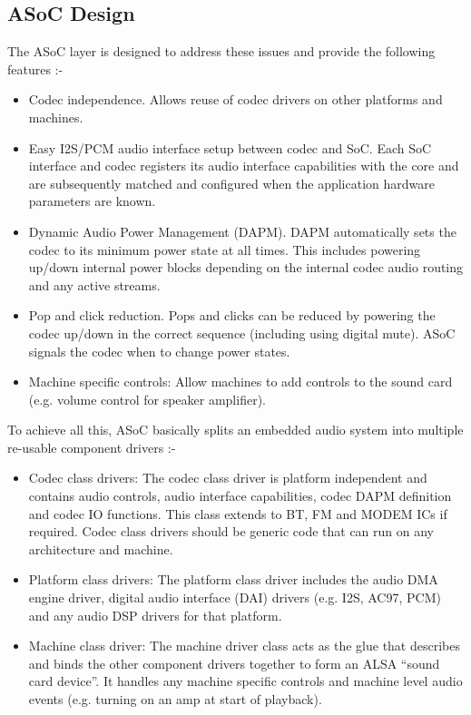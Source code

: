 \documentclass[a4paper,8pt,english]{sphinxmanual}
\begin{document}
\subsection{ASoC Design}
\label{sound/soc/overview:asoc-design}
The ASoC layer is designed to address these issues and provide the following
features :-
\begin{itemize}
\item {} 
Codec independence. Allows reuse of codec drivers on other platforms
and machines.

\item {} 
Easy I2S/PCM audio interface setup between codec and SoC. Each SoC
interface and codec registers its audio interface capabilities with the
core and are subsequently matched and configured when the application
hardware parameters are known.

\item {} 
Dynamic Audio Power Management (DAPM). DAPM automatically sets the codec to
its minimum power state at all times. This includes powering up/down
internal power blocks depending on the internal codec audio routing and any
active streams.

\item {} 
Pop and click reduction. Pops and clicks can be reduced by powering the
codec up/down in the correct sequence (including using digital mute). ASoC
signals the codec when to change power states.

\item {} 
Machine specific controls: Allow machines to add controls to the sound card
(e.g. volume control for speaker amplifier).

\end{itemize}

To achieve all this, ASoC basically splits an embedded audio system into
multiple re-usable component drivers :-
\begin{itemize}
\item {} 
Codec class drivers: The codec class driver is platform independent and
contains audio controls, audio interface capabilities, codec DAPM
definition and codec IO functions. This class extends to BT, FM and MODEM
ICs if required. Codec class drivers should be generic code that can run
on any architecture and machine.

\item {} 
Platform class drivers: The platform class driver includes the audio DMA
engine driver, digital audio interface (DAI) drivers (e.g. I2S, AC97, PCM)
and any audio DSP drivers for that platform.

\item {} 
Machine class driver: The machine driver class acts as the glue that
describes and binds the other component drivers together to form an ALSA
``sound card device''. It handles any machine specific controls and
machine level audio events (e.g. turning on an amp at start of playback).

\end{itemize}
\end{document}
